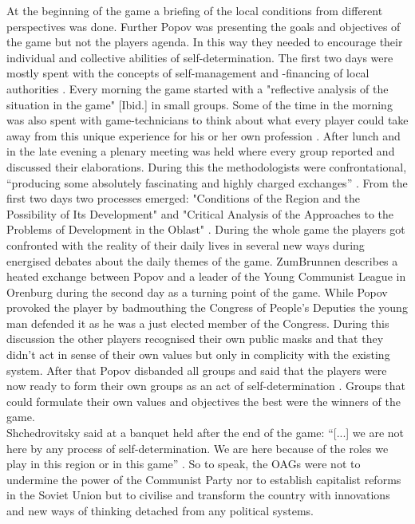 \documentclass[11pt,a4paper]{article}
\begin{document}
At the beginning of the game a briefing of the local conditions from different perspectives was done. Further Popov was presenting the goals and objectives of the game but not the players agenda. In this way they needed to encourage their individual and collective abilities of self-determination. The first two days were mostly spent with the concepts of self-management and -financing of local authorities \linebreak \cite[p. 4]{Brunnen}. Every morning the game started with a "reflective analysis of the situation in the game" [Ibid.] in small groups. Some of the time in the morning was also spent with game-technicians to think about what every player could take away from this unique experience for his or her own profession \cite[p. 5]{Brunnen}. After lunch and in the late evening a plenary meeting was held where every group reported and discussed their elaborations. During this the methodologists were confrontational, “producing some absolutely fascinating and highly charged exchanges” \cite[p. 4]{Brunnen}. From the first two days two processes emerged: "Conditions of the Region and the Possibility of Its Development" and "Critical Analysis of the Approaches to the Problems of Development in the Oblast" \cite[p. 5]{Brunnen}. During the whole game the players got confronted with the reality of their daily lives in several new ways during energised debates about the daily themes of the game. ZumBrunnen describes a heated exchange between Popov and a leader of the Young Communist League in Orenburg during the second day as a turning point of the game. While Popov provoked the player by badmouthing the Congress of People's Deputies the young man defended it as he was a just elected member of the Congress. During this discussion the other players recognised their own public masks and that they didn’t act in sense of their own values but only in complicity with the existing system. After that Popov disbanded all groups and said that the players were now ready to form their own groups as an act of self-determination \cite[p. 6]{Brunnen}. Groups that could formulate their own values and objectives the best were the winners of the game. \\
Shchedrovitsky said at a banquet held after the end of the game: “[...] we are not here by any process of self-determination. We are here because of the roles we play in this region or in this game” \cite[p. 6]{Brunnen}. So to speak, the OAGs were not to undermine the power of the Communist Party nor to establish capitalist reforms in the Soviet Union but to civilise and transform the country with innovations and new ways of thinking detached from any political systems.
\end{document}
